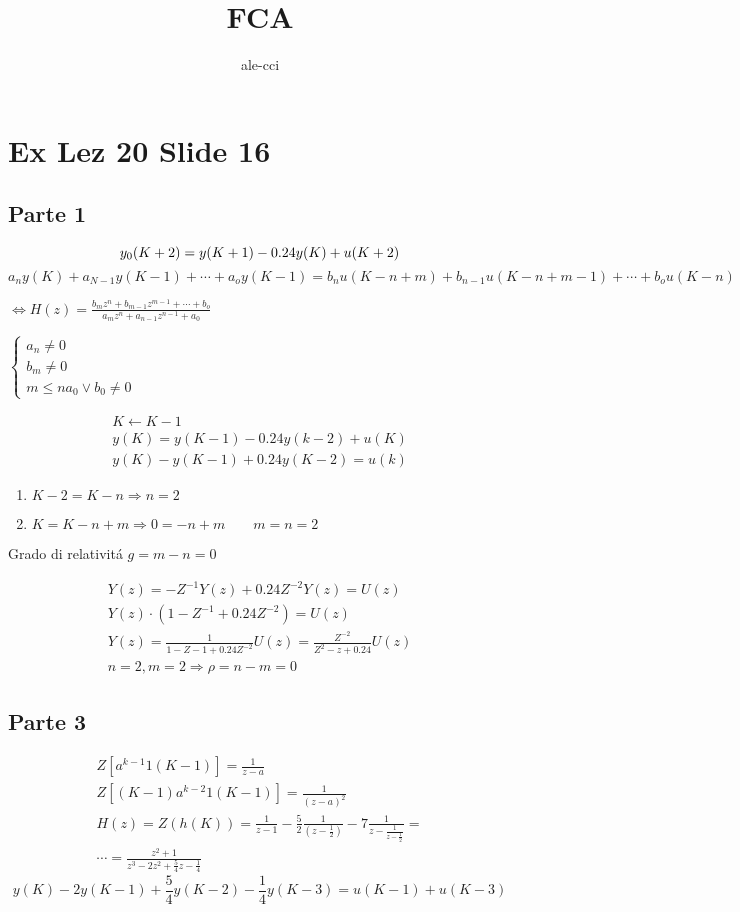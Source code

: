 \documentclass{article}
\title{FCA}
\author{ale-cci}
\begin{document}
\maketitle
\newpage
\section{Ex Lez 20 Slide 16}

\subsection{Parte 1}

\[
    y_0(K+2) = y(K+1) - 0.24y(K) + u(K+2)\\
\]
\bigbreak
\(
    a_ny(K) + a_{N-1}y(K-1) + \cdots +a_o y(K-1) = b_n u(K-n +m) + b_{n-1} u(K-n+m-1) + \cdots + b_o u(K-n)
\)

\(
\Leftrightarrow H(z) = \frac{b_mz^{n} + b_{m-1}z^{m-1}+ \cdots + b_o}{a_mz^n + a_{n-1}z^{n-1}+a_0}
\)
\bigbreak

\(
\begin{cases}
a_n \neq 0\\
b_m \neq 0 \\
m \le n
a_0 \lor b_0 \neq 0
\end{cases}
\)

\[
\begin{split}
K \leftarrow K-1\\
y(K) = y(K-1) - 0.24 y(k-2) + u(K)\\
y(K) - y(K-1) + 0.24 y(K-2) = u(k)
\end{split}
\]

\begin{enumerate}
    \item $K-2 = K - n \Rightarrow n = 2$
    \item $K = K - n + m \Rightarrow 0 = -n + m \qquad m = n = 2$
\end{enumerate}


Grado di relativit\'a $g = m-n = 0$

\begin{align*}
Y(z) = -Z^{-1} Y(z) + 0.24 Z^{-2} Y(z) = U(z)\\
Y(z) \cdot (1-Z^{-1} + 0.24 Z^{-2}) =  U(z)\\
Y(z) = \frac{1}{1-Z-1 + 0.24 Z^{-2}}U(z) = \frac{Z^{-2}}{Z^2 - z + 0.24} U(z)\\
n = 2, m=2 \Rightarrow \rho = n - m = 0
\end{align*}

\subsection{Parte 3}
\[
\begin{split}
    Z[ a^{k-1} 1(K-1)] = \frac{1}{z-a}\\
    Z[ (K-1) a^{k-2} 1(K-1)] = \frac{1}{(z-a)^2}\\
    H(z) = Z(h(K)) = \frac{1}{z-1} -
    \frac{5}{2} \frac{1}{\left( z - \frac{1}{2}\right)} - 7 \frac{1}{z-\frac{1}{z - \frac{1}{2}}} = \\
    \cdots = \frac{z^2 +1}{z^3 -2z^2 + \frac{5}{4} z - \frac{1}{4}}
\end{split}
\]
\[
    y(K) - 2y(K-1) + \frac{5}{4}y(K-2) - \frac{1}{4}y(K-3) = u(K-1) + u(K-3)
\]
\end{document}
